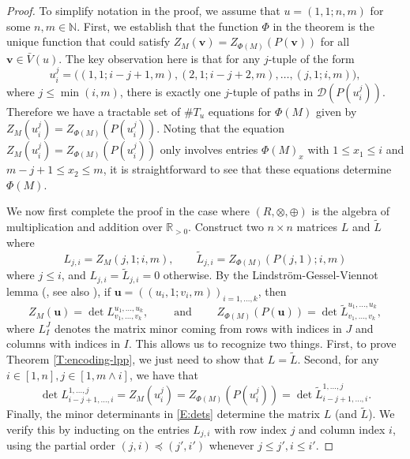 \documentclass[aop, preprint]{imsart}
\theoremstyle{plain}
\theoremstyle{definition}
\theoremstyle{plain}
\newcommand{\N}{\mathbb{N}}
\newcommand{\mathand}{\;\text{and}\;}
\newcommand{\scrD}{\mathcal{D}}
\newcommand{\R}{\mathds{R}}
\newcommand{\X}{\times}
\newcommand{\bu}{\mathbf{u}}
\newcommand{\bv}{\mathbf{v}}
\begin{document}
\begin{proof}
	To simplify notation in the proof, we assume that $u = (1, 1; n, m)$ for some $n, m \in \N$.
	First, we establish that the function $\Phi$ in the theorem is the unique function that could satisfy $Z_M(\bv) = Z_{\Phi(M)}(P(\bv))$ for all $\bv \in \bar V(u)$. The key observation here is that for any $j$-tuple of the form
	\begin{equation}
	\label{E:u-string}
	u_i^j  = \big((1, 1; i - j + 1, m), (2, 1; i - j + 2, m), \dots, (j, 1; i, m)\big),
	\end{equation}
	where $j \le \min(i, m)$, there is exactly one $j$-tuple of paths in $\scrD(P(u_i^j ))$. Therefore we have a tractable set of $\# T_u$ equations for $\Phi(M)$ given by $Z_M(u_i^j ) = Z_{\Phi(M)}(P(u_i^j ))$. Noting that the equation $Z_M(u_i^j ) = Z_{\Phi(M)}(P(u_i^j ))$ only involves entries $\Phi(M)_x$ with $1 \le x_1 \le i$ and $m- j +1 \le x_2 \le m$, it is straightforward to see that these equations determine $\Phi(M)$.
	
	We now first complete the proof in the case where $(R, \otimes, \oplus)$ is the algebra of multiplication and addition over $\R_{> 0}$. Construct two $n \X n$ matrices $L$ and $\tilde L$ where
	$$
	L_{j, i} = Z_M(j, 1; i, m), \qquad \tilde L_{j, i} = Z_{\Phi(M)}(P(j, 1); i, m)
	$$ 
	where $j \le i$, and $L_{j, i} = \tilde L_{j, i} = 0$ otherwise. By the Lindstr\"om-Gessel-Viennot lemma (\citep{lindstrom1973vector, gessel1985binomial}, see also \citep{karlin1959coincidence}), if $\bu = ((u_i, 1; v_i, m))_{i = 1, \dots, k}$, then 
	$$
	Z_M(\bu) = \det L^{u_1, \dots, u_k}_{v_1, \dots, v_k} , \qquad \mathand \qquad Z_{\Phi(M)}(P(\bu)) = \det \tilde L^{u_1, \dots, u_k}_{v_1, \dots, v_k},
	$$
	where $L^J_I$ denotes the matrix minor coming from rows with indices in $J$ and columns with indices in $I$. This allows us to recognize two things. First, to prove Theorem \ref{T:encoding-lpp}, we just need to show that $L = \tilde L$. Second, for any $i \in [1, n], j \in [1, m \wedge i]$, we have that
	\begin{equation}
		\label{E:dets}
		\det L^{1, \dots, j}_{i - j +1, \dots, i} = Z_M(u_i^j) = Z_{\Phi(M)}(P(u_i^j )) = \det \tilde L^{1, \dots, j}_{i - j +1, \dots, i}.
	\end{equation}
	Finally, the minor determinants in \eqref{E:dets} determine the matrix $L$ (and $\tilde L$). We verify this by inducting on the entries $L_{j, i}$ with row index $j$ and column index $i$, using the partial order $(j, i) \preceq (j', i')$ whenever $j \le j', i \le i'$. 
	

\end{proof}
\end{document}

